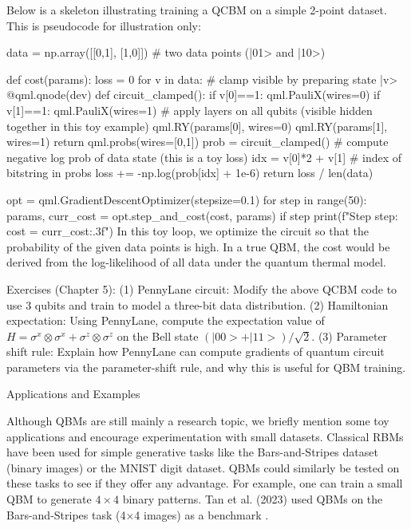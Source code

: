 Below is a skeleton illustrating training a QCBM on a simple 2-point dataset. This is pseudocode for illustration only:

data = np.array([[0,1], [1,0]])  # two data points (|01> and |10>)

def cost(params):
    loss = 0
    for v in data:
        # clamp visible by preparing state |v>
        @qml.qnode(dev)
        def circuit_clamped():
            if v[0]==1: qml.PauliX(wires=0)
            if v[1]==1: qml.PauliX(wires=1)
            # apply layers on all qubits (visible hidden together in this toy example)
            qml.RY(params[0], wires=0)
            qml.RY(params[1], wires=1)
            return qml.probs(wires=[0,1])
        prob = circuit_clamped()
        # compute negative log prob of data state (this is a toy loss)
        idx = v[0]*2 + v[1]  # index of bitstring in probs
        loss += -np.log(prob[idx] + 1e-6)
    return loss / len(data)

opt = qml.GradientDescentOptimizer(stepsize=0.1)
for step in range(50):
    params, curr_cost = opt.step_and_cost(cost, params)
    if step%
        print(f"Step {step}: cost = {curr_cost:.3f}")
In this toy loop, we optimize the circuit so that the probability of the given data points is high. In a true QBM, the cost would be derived from the log-likelihood of all data under the quantum thermal model.



Exercises (Chapter 5): (1) PennyLane circuit: Modify the above QCBM code to use 3 qubits and train to model a three-bit data distribution. (2) Hamiltonian expectation: Using PennyLane, compute the expectation value of $H = \sigma^x\otimes\sigma^x + \sigma^z\otimes\sigma^z$ on the Bell state $(|00>+|11>)/\sqrt{2}$. (3) Parameter shift rule: Explain how PennyLane can compute gradients of quantum circuit parameters via the parameter-shift rule, and why this is useful for QBM training.





Applications and Examples





Although QBMs are still mainly a research topic, we briefly mention some toy applications and encourage experimentation with small datasets.  Classical RBMs have been used for simple generative tasks like the Bars-and-Stripes dataset (binary images) or the MNIST digit dataset.  QBMs could similarly be tested on these tasks to see if they offer any advantage. For example, one can train a small QBM to generate $4\times4$ binary patterns.  Tan et al. (2023) used QBMs on the Bars-and-Stripes task (4×4 images) as a benchmark .



